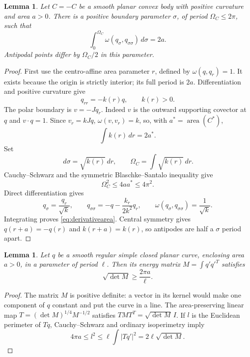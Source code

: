 \documentclass[11pt]{amsart}
\newtheorem{lemma}[theorem]{Lemma}
\theoremstyle{remark}
\newcommand{\area}{\operatorname{area}}
\newcommand{\dd}{\,d}
\begin{document}
\begin{lemma}\label{lem:parameter}
Let $C=-C$ be a smooth planar convex body with positive curvature
and area $a>0$. There is a positive boundary parameter $\sigma$,
of period $\Omega_C\leq2\pi$, such that
\begin{equation}\label{eq:derivativearea}
\int_0^{\Omega_C}\omega(q_\sigma,q_{\sigma\sigma})\dd\sigma=2a.
\end{equation}
Antipodal points differ by $\Omega_C/2$ in this parameter.
\end{lemma}
\begin{proof}
First use the centro-affine area parameter $r$, defined by
$\omega(q,q_r)=1$. It exists because the origin is strictly interior;
its full period is $2a$. Differentiation and positive curvature give
\[
q_{rr}=-k(r)q,\qquad k(r)>0.
\]
The polar boundary is $v=-Jq_r$. Indeed $v$ is the outward supporting
covector at $q$ and $v\cdot q=1$. Since $v_r=kJq$,
$\omega(v,v_r)=k$, so, with $a^*=\area(C^*)$,
\[
\int k(r)\dd r=2a^*.
\]
Set
\[
\dd\sigma=\sqrt{k(r)}\dd r,\qquad
\Omega_C=\int\sqrt{k(r)}\dd r.
\]
Cauchy--Schwarz and the symmetric Blaschke--Santalo inequality
\cite[Theorem 1]{BK} give
\begin{equation}\label{eq:period}
\Omega_C^2\leq4aa^*\leq4\pi^2.
\end{equation}
Direct differentiation gives
\[
q_\sigma=\frac{q_r}{\sqrt{k}},\qquad
q_{\sigma\sigma}=-q-\frac{k_r}{2k^2}q_r,\qquad
\omega(q_\sigma,q_{\sigma\sigma})=\frac1{\sqrt{k}}.
\]
Integrating proves \eqref{eq:derivativearea}.
Central symmetry gives $q(r+a)=-q(r)$ and $k(r+a)=k(r)$,
so antipodes are half a $\sigma$ period apart.
\end{proof}

\begin{lemma}\label{lem:energy}
Let $q$ be a smooth regular simple closed planar curve, enclosing area
$a>0$, in a parameter of period $\ell$. Then its energy matrix
$M=\int q'q'^T$ satisfies
\begin{equation}\label{eq:detbound}
\sqrt{\det M}\geq\frac{2\pi a}{\ell}.
\end{equation}
\end{lemma}
\begin{proof}
The matrix $M$ is positive definite: a vector in its kernel would make
one component of $q$ constant and put the curve in a line.
The area-preserving linear map
$T=(\det M)^{1/4}M^{-1/2}$ satisfies
$TMT^T=\sqrt{\det M}\,I$. If $l$ is the Euclidean perimeter of $Tq$,
Cauchy--Schwarz and ordinary isoperimetry
\cite[Section 1, equation (1.5)]{Osserman} imply
\[
4\pi a\leq l^2
\leq\ell\int|Tq'|^2
=2\ell\sqrt{\det M}.
\]
\end{proof}
\end{document}
